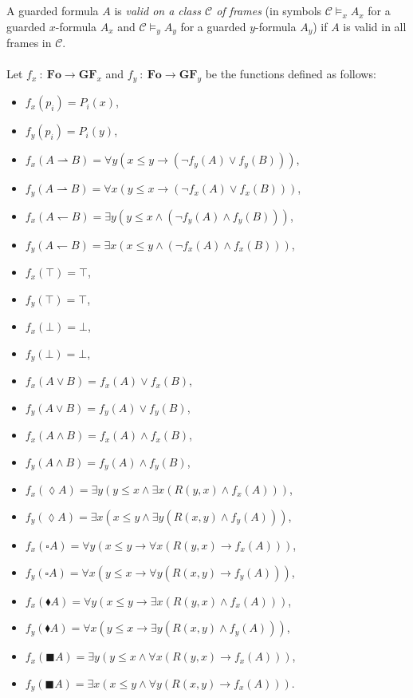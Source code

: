 \documentclass[draft]{article}
\def\Fo{\mathbf{Fo}}
\def\GFo{\mathbf{GF}}
\begin{document}
%
%
\\
\\
%
%
A guarded formula $A$ is {\em valid on a class ${\mathcal C}$ of frames}\/ (in symbols ${\mathcal C}{\models_{x}}A_{x}$ for a guarded $x$-formula $A_{x}$ and ${\mathcal C}{\models_{y}}A_{y}$ for a guarded $y$-formula $A_{y}$) if $A$ is valid in all frames in ${\mathcal C}$.
%
%
\\
\\
%
%
Let $f_{x}\ :\ \Fo{\longrightarrow}\GFo_{x}$ and $f_{y}\ :\ \Fo{\longrightarrow}\GFo_{y}$ be the functions defined as follows:
%
%
\begin{itemize}
%
%
\item $f_{x}(p_{i}){=}P_{i}(x)$,
%
%
\item $f_{y}(p_{i}){=}P_{i}(y)$,
%
%
\item $f_{x}(A{\rightharpoonup}B){=}{\forall y}(x{\leq}y{\rightarrow}(\neg f_{y}(A){\vee}f_{y}(B)))$,
%
%
\item $f_{y}(A{\rightharpoonup}B){=}{\forall x}(y{\leq}x{\rightarrow}(\neg f_{x}(A){\vee}f_{x}(B)))$,
%
%
\item $f_{x}(A{\leftharpoondown}B){=}{\exists y}(y{\leq}x{\wedge}(\neg f_{y}(A){\wedge}f_{y}(B)))$,
%
%
\item $f_{y}(A{\leftharpoondown}B){=}{\exists x}(x{\leq}y{\wedge}(\neg f_{x}(A){\wedge}f_{x}(B)))$,
%
%
\item $f_{x}({\top}){=}{\top}$,
%
%
\item $f_{y}({\top}){=}{\top}$,
%
%
\item $f_{x}({\bot}){=}{\bot}$,
%
%
\item $f_{y}({\bot}){=}{\bot}$,
%
%
\item $f_{x}(A{\vee}B){=}f_{x}(A){\vee}f_{x}(B)$,
%
%
\item $f_{y}(A{\vee}B){=}f_{y}(A){\vee}f_{y}(B)$,
%
%
\item $f_{x}(A{\wedge}B){=}f_{x}(A){\wedge}f_{x}(B)$,
%
%
\item $f_{y}(A{\wedge}B){=}f_{y}(A){\wedge}f_{y}(B)$,
%
%
\item $f_{x}({\lozenge}A){=}{\exists y}(y{\leq}x{\wedge}{\exists x}(R(y,x){\wedge}f_{x}(A)))$,
%
%
\item $f_{y}({\lozenge}A){=}{\exists x}(x{\leq}y{\wedge}{\exists y}(R(x,y){\wedge}f_{y}(A)))$,
%
%
\item $f_{x}({\square}A){=}{\forall y}(x{\leq}y{\rightarrow}{\forall x}(R(y,x){\rightarrow}f_{x}(A)))$,
%
%
\item $f_{y}({\square}A){=}{\forall x}(y{\leq}x{\rightarrow}{\forall y}(R(x,y){\rightarrow}f_{y}(A)))$,
%
%
\item $f_{x}({\blacklozenge}A){=}{\forall y}(x{\leq}y{\rightarrow}{\exists x}(R(y,x){\wedge}f_{x}(A)))$,
%
%
\item $f_{y}({\blacklozenge}A){=}{\forall x}(y{\leq}x{\rightarrow}{\exists y}(R(x,y){\wedge}f_{y}(A)))$,
%
%
\item $f_{x}({\blacksquare}A){=}{\exists y}(y{\leq}x{\wedge}{\forall x}(R(y,x){\rightarrow}f_{x}(A)))$,
%
%
\item $f_{y}({\blacksquare}A){=}{\exists x}(x{\leq}y{\wedge}{\forall y}(R(x,y){\rightarrow}f_{x}(A)))$.
%
%
\end{itemize}
\end{document}
